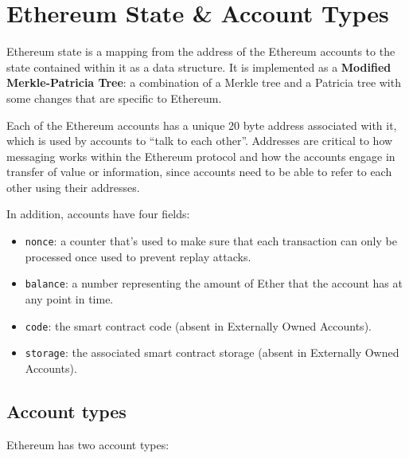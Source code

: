 \section{Ethereum State \& Account
Types}\label{ethereum-state-account-types}

Ethereum state is a mapping from the address of the Ethereum accounts to
the state contained within it as a data structure. It is implemented as
a \textbf{Modified Merkle-Patricia Tree}: a combination of a Merkle tree
and a Patricia tree with some changes that are specific to Ethereum.

Each of the Ethereum accounts has a unique 20 byte address associated
with it, which is used by accounts to ``talk to each other''. Addresses
are critical to how messaging works within the Ethereum protocol and how
the accounts engage in transfer of value or information, since accounts
need to be able to refer to each other using their addresses.

In addition, accounts have four fields:

\begin{itemize}
\tightlist
\item
  \texttt{nonce}: a counter that's used to make sure that each
  transaction can only be processed once used to prevent replay attacks.
\item
  \texttt{balance}: a number representing the amount of Ether that the
  account has at any point in time.
\item
  \texttt{code}: the smart contract code (absent in Externally Owned
  Accounts).
\item
  \texttt{storage}: the associated smart contract storage (absent in
  Externally Owned Accounts).
\end{itemize}

\subsection{Account types}\label{account-types}

Ethereum has two account types:

